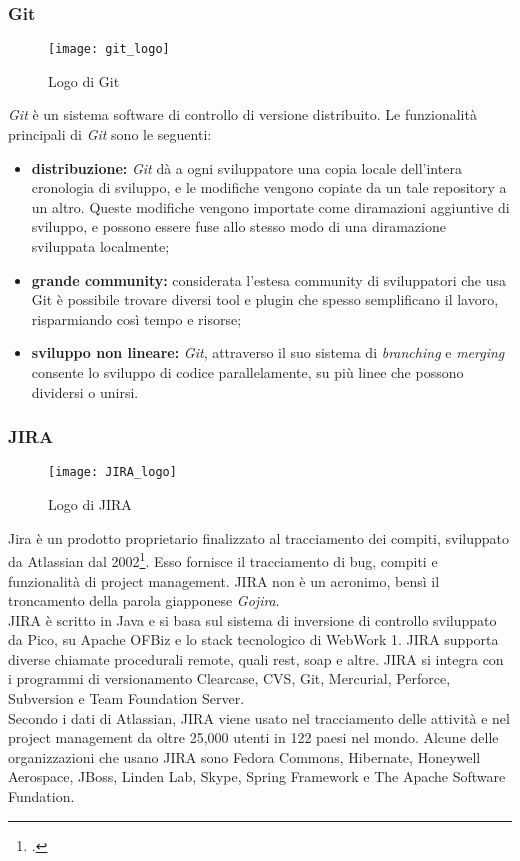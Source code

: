 \subsubsection{Git}
\begin{figure}[htb] 
    \centering 
    \texttt{[image: git\_logo]} 
    \caption{Logo di Git}
\end{figure}
\emph{Git} è un sistema software di controllo di versione distribuito. Le funzionalità principali di \emph{Git} sono le seguenti:
\begin{itemize}
	\item \textbf{distribuzione:} \emph{Git} dà a ogni sviluppatore una copia locale dell'intera cronologia di sviluppo, e le modifiche vengono copiate da un tale repository a un altro. Queste modifiche vengono importate come diramazioni aggiuntive di sviluppo, e possono essere fuse allo stesso modo di una diramazione sviluppata localmente;
	\item \textbf{grande community:} considerata l’estesa community di sviluppatori che usa
Git è possibile trovare diversi tool e plugin che spesso semplificano il lavoro,
risparmiando così tempo e risorse;
	\item \textbf{sviluppo non lineare:} \emph{Git}, attraverso il suo sistema di \emph{branching} e \emph{merging} consente lo sviluppo di codice parallelamente, su più linee che possono dividersi o unirsi.
\end{itemize}

\subsubsection{JIRA}
\begin{figure}[htb] 
    \centering 
    \texttt{[image: JIRA\_logo]} 
    \caption{Logo di JIRA}
\end{figure}
Jira è un prodotto proprietario finalizzato al tracciamento dei compiti, sviluppato da Atlassian dal 2002\footcite{atlassian:jira}. Esso fornisce il tracciamento di bug, compiti e funzionalità di project management. JIRA non è un acronimo, bensì il troncamento della parola giapponese \emph{Gojira}.\\
JIRA è scritto in Java e si basa sul sistema di inversione di controllo sviluppato da Pico, su Apache OFBiz e lo stack tecnologico di WebWork 1. JIRA supporta diverse chiamate procedurali remote, quali \gls{rest}, \gls{soap} e altre. JIRA si integra con i programmi di versionamento Clearcase, CVS, Git, Mercurial, Perforce, Subversion e Team Foundation Server.\\
Secondo i dati di Atlassian, JIRA viene usato nel tracciamento delle attività e nel project management da oltre 25,000 utenti in 122 paesi nel mondo. Alcune delle organizzazioni che usano JIRA sono Fedora Commons, Hibernate, Honeywell Aerospace, JBoss, Linden Lab, Skype, Spring Framework e The Apache Software Fundation.  

